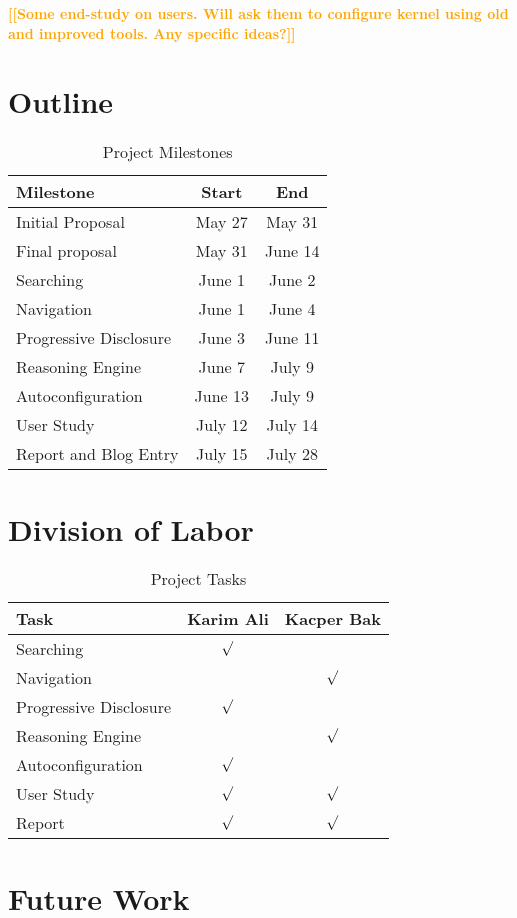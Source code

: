 \documentclass{chi2009}
\newcommand{\todo}[1]{\textsf{\textbf{\textcolor{Orange}{[[#1]]}}}}
\begin{document}
\todo{Some end-study on users. Will ask them to configure kernel using old and improved tools. Any specific ideas?}

\section{Outline}

\begin{table}[!h]
\centering
\begin{tabularx}{0.5\textwidth}{X c c}
\toprule
\textbf{Milestone} & \textbf{Start} & \textbf{End}\\ \midrule
Initial Proposal & May 27 & May 31\\
Final proposal & May 31 & June 14 \\
Searching & June 1 & June 2\\
Navigation & June 1 & June 4\\
Progressive Disclosure & June 3 & June 11\\
Reasoning Engine & June 7 & July 9\\
Autoconfiguration & June 13 & July 9\\
User Study & July 12 & July 14\\
Report and Blog Entry & July 15 & July 28\\
\bottomrule
\end{tabularx}
\caption{Project Milestones}
\label{tab:outline}
\end{table}


\section{Division of Labor}

\begin{table}[!h]
\centering
\begin{tabularx}{0.5\textwidth}{X c c}
\toprule
\textbf{Task} & \textbf{Karim Ali} & \textbf{Kacper Bak}\\ \midrule
Searching & $\surd$ &\\
Navigation & & $\surd$\\
Progressive Disclosure & $\surd$ &\\
Reasoning Engine & & $\surd$\\
Autoconfiguration & $\surd$ &\\
User Study & $\surd$ & $\surd$\\
Report & $\surd$ & $\surd$\\
\bottomrule
\end{tabularx}
\caption{Project Tasks}
\label{tab:plan}
\end{table}

\section{Future Work}



\end{document}
